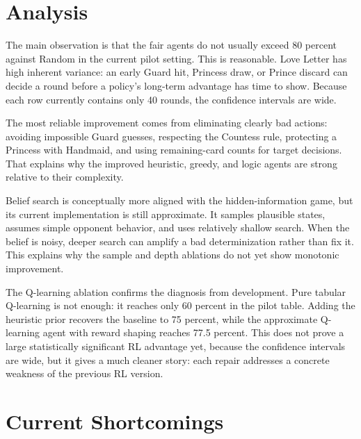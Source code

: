 \documentclass[10pt,twocolumn]{article}
\begin{document}
\section{Analysis}

The main observation is that the fair agents do not usually exceed 80 percent
against Random in the current pilot setting. This is reasonable. Love Letter
has high inherent variance: an early Guard hit, Princess draw, or Prince
discard can decide a round before a policy's long-term advantage has time to
show. Because each row currently contains only 40 rounds, the confidence
intervals are wide.

The most reliable improvement comes from eliminating clearly bad actions:
avoiding impossible Guard guesses, respecting the Countess rule, protecting a
Princess with Handmaid, and using remaining-card counts for target decisions.
That explains why the improved heuristic, greedy, and logic agents are strong
relative to their complexity.

Belief search is conceptually more aligned with the hidden-information game,
but its current implementation is still approximate. It samples plausible
states, assumes simple opponent behavior, and uses relatively shallow search.
When the belief is noisy, deeper search can amplify a bad determinization
rather than fix it. This explains why the sample and depth ablations do not
yet show monotonic improvement.

The Q-learning ablation confirms the diagnosis from development. Pure tabular
Q-learning is not enough: it reaches only 60 percent in the pilot table.
Adding the heuristic prior recovers the baseline to 75 percent, while the
approximate Q-learning agent with reward shaping reaches 77.5 percent. This
does not prove a large statistically significant RL advantage yet, because the
confidence intervals are wide, but it gives a much cleaner story: each repair
addresses a concrete weakness of the previous RL version.

\section{Current Shortcomings}
\end{document}
